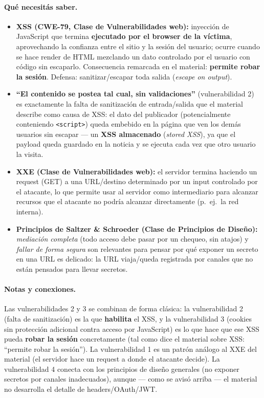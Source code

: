 \paragraph{Qué necesitás saber.}
\begin{itemize}
  \item \textbf{XSS (CWE-79, Clase de Vulnerabilidades web):} inyección de JavaScript
  que termina \textbf{ejecutado por el browser de la víctima}, aprovechando la confianza
  entre el sitio y la sesión del usuario; ocurre cuando se hace render de HTML
  mezclando un dato controlado por el usuario con código sin escaparlo. Consecuencia
  remarcada en el material: \textbf{permite robar la sesión}. Defensa: sanitizar/escapar
  toda salida (\emph{escape on output}).
  \item \textbf{``El contenido se postea tal cual, sin validaciones''} (vulnerabilidad 2)
  es exactamente la falta de sanitización de entrada/salida que el material describe
  como causa de XSS: el dato del publicador (potencialmente conteniendo
  \texttt{<script>}) queda embebido en la página que ven los demás usuarios sin
  escapar --- un \textbf{XSS almacenado} (\emph{stored XSS}), ya que el payload queda
  guardado en la noticia y se ejecuta cada vez que otro usuario la visita.
  \item \textbf{XXE (Clase de Vulnerabilidades web):} el servidor termina haciendo un
  request (GET) a una URL/destino determinado por un input controlado por el atacante,
  lo que permite usar al servidor como intermediario para alcanzar recursos que el
  atacante no podría alcanzar directamente (p.\ ej.\ la red interna).
  \item \textbf{Principios de Saltzer \& Schroeder (Clase de Principios de Diseño):}
  \emph{mediación completa} (todo acceso debe pasar por un chequeo, sin atajos) y
  \emph{fallar de forma segura} son relevantes para pensar por qué exponer un secreto en
  una URL es delicado: la URL viaja/queda registrada por canales que no están pensados
  para llevar secretos.
\end{itemize}

\paragraph{Notas y conexiones.}
Las vulnerabilidades 2 y 3 se combinan de forma clásica: la vulnerabilidad 2 (falta de
sanitización) es la que \textbf{habilita} el XSS, y la vulnerabilidad 3 (cookies sin
protección adicional contra acceso por JavaScript) es lo que hace que ese XSS pueda
\textbf{robar la sesión} concretamente (tal como dice el material sobre XSS: ``permite
robar la sesión''). La vulnerabilidad 1 es un patrón análogo al XXE del material
(el servidor hace un request a donde el atacante decide). La vulnerabilidad 4 conecta con
los principios de diseño generales (no exponer secretos por canales inadecuados), aunque
--- como se avisó arriba --- el material no desarrolla el detalle de headers/OAuth/JWT.


